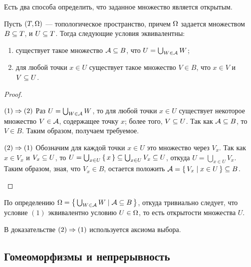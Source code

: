 \documentclass[main]{subfiles}
\begin{document}
Есть два способа определить, что заданное множество является открытым.

\begin{theorem} Пусть $ (T, \Omega) $ --- топологическое пространство,
	причем $ \Omega $ задается множеством $ B \subseteq T $, и $ U \subseteq T $. Тогда следующие условия эквивалентны:
	\begin{enumerate}
		\item существует такое множество $ \mathcal{A} \subseteq B $, что $ U = \bigcup_{W \in \mathcal{A}} W $;
		\item для любой точки $ x \in U $ существует такое множество $ V \in B $, что $ x \in V $ и $ V \subseteq U $.
	\end{enumerate}
\end{theorem}

\begin{proof} \leavevmode
	\begin{multiproof}
		\item[$(1)\Rightarrow(2)$] Раз $ U = \bigcup_{W \in \mathcal{A}} W $, то для любой точки $ x \in U $ существует
			некоторое множество $ V \in \mathcal{A} $, содержащее точку $ x $; более того, $ V \subseteq U $.
			Так как $ \mathcal{A} \subseteq B $, то $ V \in B $. Таким образом, получаем требуемое.
		\item[$(2)\Rightarrow(1)$] Обозначим для каждой точки $ x \in U $ это множество через $ V_x $.
			Так как $ x \in V_x $ и $ V_x \subseteq U $, то
			$ U = \bigcup_{x \in U} \left\{\, x \,\right\} \subseteq \bigcup_{x \in U} V_x \subseteq U $, откуда
			$ U = \bigcup_{x \in U} V_x $. Таким образом, зная, что $ V_x \in B $, остается положить
			$ \mathcal{A} = \left\{\, V_x \mid x \in U \,\right\} \subseteq B $.
	\end{multiproof}
\end{proof}

\begin{remark}
	По определению $ \Omega = \left\{\, \bigcup_{W \in \mathcal{A}} W \mid \mathcal{A} \subseteq B \,\right\} $, откуда тривиально следует, что условие $(1)$ эквивалентно условию $ U \in \Omega $, то есть открытости множества $ U $.
\end{remark}

\begin{remark}
	В доказательстве $(2)\Rightarrow(1)$ используется аксиома выбора.
\end{remark}

\subsection{Гомеоморфизмы и непрерывность}
\end{document}
